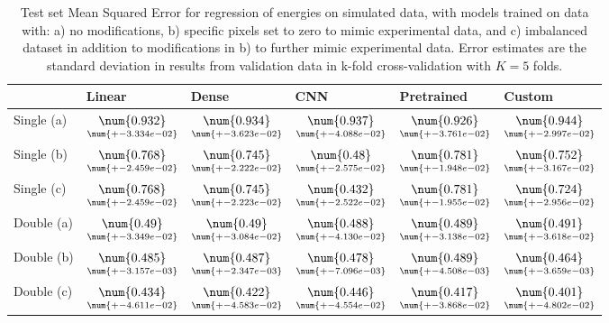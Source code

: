 \begin{table}
\centering
\caption{
Test set Mean Squared Error for regression of energies on simulated data, with models trained on data with: 
a) no modifications, b) specific pixels set to zero to mimic experimental data, and c) imbalanced dataset
in addition to modifications in b) to further mimic experimental data. Error estimates are the standard deviation 
in results from validation data in k-fold cross-validation with $K=5$ folds.
}
\label{tab:regression-simulated-all-energies-r2}
\begin{tabular}{llllll}
\toprule
{} &                                              Linear &                                               Dense &                                                 CNN &                                          Pretrained &                                              Custom \\
\midrule
Single (a) &  $\underset{\num{+- 3.334e-02 }  }{\num{ 0.932 } }$ &  $\underset{\num{+- 3.623e-02 }  }{\num{ 0.934 } }$ &  $\underset{\num{+- 4.088e-02 }  }{\num{ 0.937 } }$ &  $\underset{\num{+- 3.761e-02 }  }{\num{ 0.926 } }$ &  $\underset{\num{+- 2.997e-02 }  }{\num{ 0.944 } }$ \\
Single (b) &  $\underset{\num{+- 2.459e-02 }  }{\num{ 0.768 } }$ &  $\underset{\num{+- 2.222e-02 }  }{\num{ 0.745 } }$ &  $\underset{\num{+- 2.575e-02 }  }{\num{ 0.48 } }$ &  $\underset{\num{+- 1.948e-02 }  }{\num{ 0.781 } }$ &  $\underset{\num{+- 3.167e-02 }  }{\num{ 0.752 } }$ \\
Single (c) &  $\underset{\num{+- 2.459e-02 }  }{\num{ 0.768 } }$ &  $\underset{\num{+- 2.223e-02 }  }{\num{ 0.745 } }$ &  $\underset{\num{+- 2.522e-02 }  }{\num{ 0.432 } }$ &  $\underset{\num{+- 1.955e-02 }  }{\num{ 0.781 } }$ &  $\underset{\num{+- 2.956e-02 }  }{\num{ 0.724 } }$ \\
Double (a) &  $\underset{\num{+- 3.349e-02 }  }{\num{ 0.49 } }$ &  $\underset{\num{+- 3.084e-02 }  }{\num{ 0.49 } }$ &  $\underset{\num{+- 4.130e-02 }  }{\num{ 0.488 } }$ &  $\underset{\num{+- 3.138e-02 }  }{\num{ 0.489 } }$ &  $\underset{\num{+- 3.618e-02 }  }{\num{ 0.491 } }$ \\
Double (b) &  $\underset{\num{+- 3.157e-03 }  }{\num{ 0.485 } }$ &  $\underset{\num{+- 2.347e-03 }  }{\num{ 0.487 } }$ &  $\underset{\num{+- 7.096e-03 }  }{\num{ 0.478 } }$ &  $\underset{\num{+- 4.508e-03 }  }{\num{ 0.489 } }$ &  $\underset{\num{+- 3.659e-03 }  }{\num{ 0.464 } }$ \\
Double (c) &  $\underset{\num{+- 4.611e-02 }  }{\num{ 0.434 } }$ &  $\underset{\num{+- 4.583e-02 }  }{\num{ 0.422 } }$ &  $\underset{\num{+- 4.554e-02 }  }{\num{ 0.446 } }$ &  $\underset{\num{+- 3.868e-02 }  }{\num{ 0.417 } }$ &  $\underset{\num{+- 4.802e-02 }  }{\num{ 0.401 } }$ \\
\bottomrule
\end{tabular}
\end{table}
